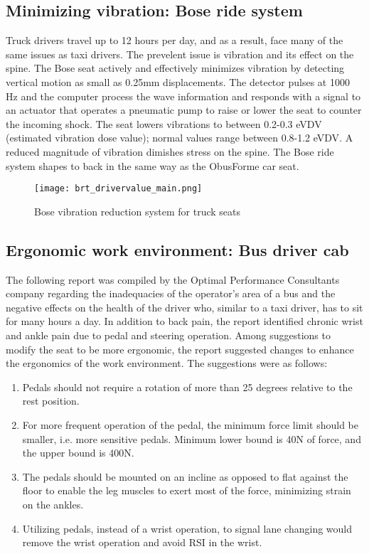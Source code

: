 \documentclass[11pt]{article}
\begin{document}
\subsection{Minimizing vibration: Bose ride system}
Truck drivers travel up to 12 hours per day, and as a result, face many of the same issues as taxi drivers. 
The prevelent issue is vibration and its effect on the spine. The Bose seat actively and effectively minimizes vibration 
by detecting vertical motion as small as 0.25mm displacements. %
The detector pulses at 1000 Hz and the computer process the 
wave information and responds with a signal to an actuator that operates a pneumatic pump to raise or lower the seat to 
counter the incoming shock. The seat lowers vibrations to between 0.2-0.3 eVDV (estimated vibration dose value); normal values range 
between 0.8-1.2 eVDV\cite{Bosetruckseat}. A reduced magnitude of vibration dimishes stress on the spine. The Bose ride system shapes to back in the same way as the 
ObusForme car seat\cite{Bosetruckseat}.
\begin{figure}[h]
  \centering
  \texttt{[image: brt\_drivervalue\_main.png]}
  \caption{Bose vibration reduction system for truck seats}
\end{figure}
\subsection{Ergonomic work environment: Bus driver cab}
The following report was compiled by the Optimal Performance Consultants company regarding the 
inadequacies of the operator's area of a bus and the negative effects on the health of the driver who, similar to a taxi driver, has to sit 
for many hours a day\cite{Ismail2003}. In addition to back pain, the report 
identified chronic wrist and ankle pain due to pedal and steering operation. Among suggestions to modify the 
seat to be more ergonomic, the report suggested changes to enhance the ergonomics of the work environment. 
The suggestions were as follows:
\begin{enumerate}
\item Pedals should not require a rotation of more than 25 degrees relative to the rest position. 
\item For more frequent operation of the pedal, the minimum force limit should be smaller, 
i.e. more sensitive pedals. Minimum lower bound is 40N of force, and the upper bound is 400N.
\item The pedals should be mounted on an incline as opposed to flat against the floor to enable the leg 
muscles to exert most of the force, minimizing strain on the ankles. 
\item Utilizing pedals, instead of a wrist operation, to signal lane changing would remove the wrist operation
and avoid RSI in the wrist.
\end{enumerate}
\end{document}
